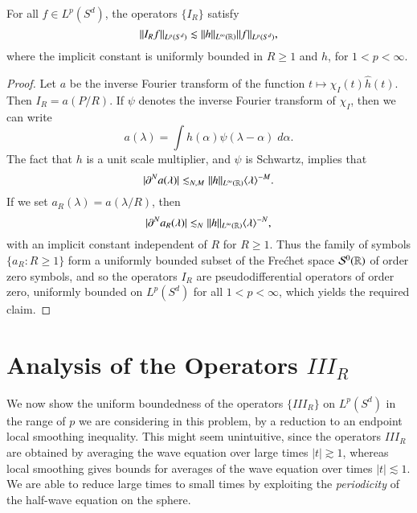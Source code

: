 \begin{lemma} \label{SmallTimeInequalityLemma}
    For all $f \in L^p(S^d)$, the operators $\{ I_R \}$ satisfy
    \[ \| I_R f \|_{L^p(S^d)} \lesssim \| h \|_{L^\infty(\operatorname{\mathbb{R}})} \| f \|_{L^p(S^d)}, \] 
    where the implicit constant is uniformly bounded in $R \geq 1$ and $h$, for $1 < p < \infty$.
\end{lemma}
\begin{proof}
    Let $a$ be the inverse Fourier transform of the function $t \mapsto \chi_I(t) \widehat{h}(t)$. Then $I_R = a(P/R)$. If $\psi$ denotes the inverse Fourier transform of $\chi_I$, then we can write
    \[ a(\lambda) = \int h(\alpha) \psi(\lambda - \alpha)\; d\alpha. \]
    The fact that $h$ is a unit scale multiplier, and $\psi$ is Schwartz, implies that
    \[ |\partial^N a(\lambda)| \lesssim_{N,M} \| h \|_{L^\infty(\operatorname{\mathbb{R}})} \langle \lambda \rangle^{-M}. \]
    If we set $a_R(\lambda) = a(\lambda / R)$, then
    \[ |\partial^N a_R(\lambda)| \lesssim_N \| h \|_{L^\infty(\operatorname{\mathbb{R}})} \langle \lambda \rangle^{-N}, \]
    with an implicit constant independent of $R$ for $R \geq 1$. Thus the family of symbols $\{ a_R : R \geq 1 \}$ form a uniformly bounded subset of the Fre\'{c}het space $\mathcal{S}^0(\operatorname{\mathbb{R}})$ of order zero symbols, and so the operators $I_R$ are pseudodifferential operators of order zero, uniformly bounded on $L^p(S^d)$ for all $1 < p < \infty$, which yields the required claim.
\end{proof}

\section{Analysis of the Operators $III_R$}

We now show the uniform boundedness of the operators $\{ III_R \}$ on $L^p(S^d)$ in the range of $p$ we are considering in this problem, by a reduction to an endpoint local smoothing inequality. This might seem unintuitive, since the operators $III_R$ are obtained by averaging the wave equation over large times $|t| \gtrsim 1$, whereas local smoothing gives bounds for averages of the wave equation over times $|t| \lesssim 1$. We are able to reduce large times to small times by exploiting the \emph{periodicity} of the half-wave equation on the sphere.

